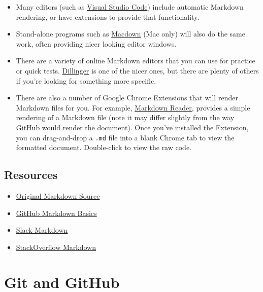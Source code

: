 \documentclass[]{book}
\providecommand{\tightlist}{%
  \setlength{\itemsep}{0pt}\setlength{\parskip}{0pt}}
\theoremstyle{definition}
\theoremstyle{definition}
\theoremstyle{remark}
\begin{document}
\begin{itemize}
\item
  Many editors (such as \href{https://code.visualstudio.com/}{Visual
  Studio Code}) include automatic Markdown rendering, or have extensions
  to provide that functionality.
\item
  Stand-alone programs such as
  \href{http://macdown.uranusjr.com/}{Macdown} (Mac only) will also do
  the same work, often providing nicer looking editor windows.
\item
  There are a variety of online Markdown editors that you can use for
  practice or quick tests. \href{http://dillinger.io/}{Dillinger} is one
  of the nicer ones, but there are plenty of others if you're looking
  for something more specific.
\item
  There are also a number of Google Chrome Extensions that will render
  Markdown files for you. For example,
  \href{https://chrome.google.com/webstore/detail/markdown-reader/gpoigdifkoadgajcincpilkjmejcaanc?hl=en}{Markdown
  Reader}, provides a simple rendering of a Markdown file (note it may
  differ slightly from the way GitHub would render the document). Once
  you've installed the Extension, you can drag-and-drop a \texttt{.md}
  file into a blank Chrome tab to view the formatted document.
  Double-click to view the raw code.
\end{itemize}

\section*{Resources}\label{resources-2}


\begin{itemize}
\tightlist
\item
  \href{https://daringfireball.net/projects/markdown/}{Original Markdown
  Source}
\item
  \href{https://help.github.com/articles/basic-writing-and-formatting-syntax/}{GitHub
  Markdown Basics}
\item
  \href{https://get.slack.help/hc/en-us/articles/202288908-Formatting-your-messages}{Slack
  Markdown}
\item
  \href{http://stackoverflow.com/editing-help}{StackOverflow Markdown}
\end{itemize}

\hypertarget{git-basics}{\chapter{Git and GitHub}\label{git-basics}}
\end{document}
